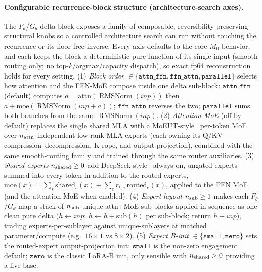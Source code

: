 \documentclass[11pt]{article}
\newcommand{\RMSNorm}{\operatorname{RMSNorm}}
\begin{document}
\paragraph{Configurable recurrence-block structure (architecture-search axes).}
The \(F_\theta\)/\(G_\theta\) delta block exposes a family of composable, reversibility-preserving
structural knobs so a controlled architecture search can run without touching the recurrence or its
floor-free inverse.  Every axis defaults to the core \(M_0\) behavior, and each keeps the block a
deterministic pure function of its single input (smooth routing only; no top-\(k\)/argmax/capacity
dispatch), so exact fp64 reconstruction holds for every setting.
(1) \emph{Block order} \(\in\{\texttt{attn\_ffn},\texttt{ffn\_attn},\texttt{parallel}\}\) selects how
attention and the FFN-MoE compose inside one delta sub-block:
\(\texttt{attn\_ffn}\) (default) computes \(a=\mathrm{attn}(\RMSNorm(\mathit{inp}))\) then
\(a+\mathrm{moe}(\RMSNorm(\mathit{inp}+a))\); \(\texttt{ffn\_attn}\) reverses the two;
\(\texttt{parallel}\) sums both branches from the same \(\RMSNorm(\mathit{inp})\).
(2) \emph{Attention MoE} (off by default) replaces the single shared MLA with a MoEUT-style~\cite{moeut}
per-token MoE over \(n_{\rm attn}\) independent low-rank MLA experts (each owning its Q/KV
compression--decompression, K-rope, and output projection), combined with the same smooth-routing
family and trained through the same router auxiliaries.
(3) \emph{Shared experts} \(n_{\rm shared}\ge0\) add DeepSeek-style~\cite{deepseekv2} always-on,
ungated experts summed into every token in addition to the routed experts,
\(\mathrm{moe}(x)=\sum_s\mathrm{shared}_s(x)+\sum_e r_{t,e}\,\mathrm{routed}_e(x)\), applied to the FFN
MoE (and the attention MoE when enabled).
(4) \emph{Expert layout} \(n_{\rm sub}\ge1\) makes each \(F_\theta\)/\(G_\theta\) map a stack of
\(n_{\rm sub}\) unique attn+MoE sub-blocks applied in sequence as one clean pure delta
(\(h\leftarrow\mathit{inp}\); \(h\leftarrow h+\mathrm{sub}(h)\) per sub-block; return \(h-\mathit{inp}\)),
trading experts-per-sublayer against unique-sublayers at matched parameter/compute
(e.g.\ \(16\times1\) vs \(8\times2\)).
(5) \emph{Expert B-init} \(\in\{\texttt{small},\texttt{zero}\}\) sets the routed-expert output-projection
init: \(\texttt{small}\) is the non-zero engagement default; \(\texttt{zero}\) is the classic LoRA-B
init, only sensible with \(n_{\rm shared}>0\) providing a live base.
\end{document}
